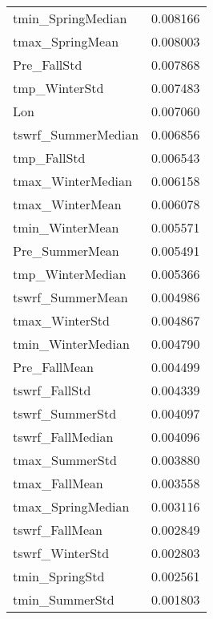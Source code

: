 \begin{tabular}{lr}
tmin_SpringMedian & 0.008166 \\
tmax_SpringMean & 0.008003 \\
Pre_FallStd & 0.007868 \\
tmp_WinterStd & 0.007483 \\
Lon & 0.007060 \\
tswrf_SummerMedian & 0.006856 \\
tmp_FallStd & 0.006543 \\
tmax_WinterMedian & 0.006158 \\
tmax_WinterMean & 0.006078 \\
tmin_WinterMean & 0.005571 \\
Pre_SummerMean & 0.005491 \\
tmp_WinterMedian & 0.005366 \\
tswrf_SummerMean & 0.004986 \\
tmax_WinterStd & 0.004867 \\
tmin_WinterMedian & 0.004790 \\
Pre_FallMean & 0.004499 \\
tswrf_FallStd & 0.004339 \\
tswrf_SummerStd & 0.004097 \\
tswrf_FallMedian & 0.004096 \\
tmax_SummerStd & 0.003880 \\
tmax_FallMean & 0.003558 \\
tmax_SpringMedian & 0.003116 \\
tswrf_FallMean & 0.002849 \\
tswrf_WinterStd & 0.002803 \\
tmin_SpringStd & 0.002561 \\
tmin_SummerStd & 0.001803 \\
\bottomrule
\end{tabular}
